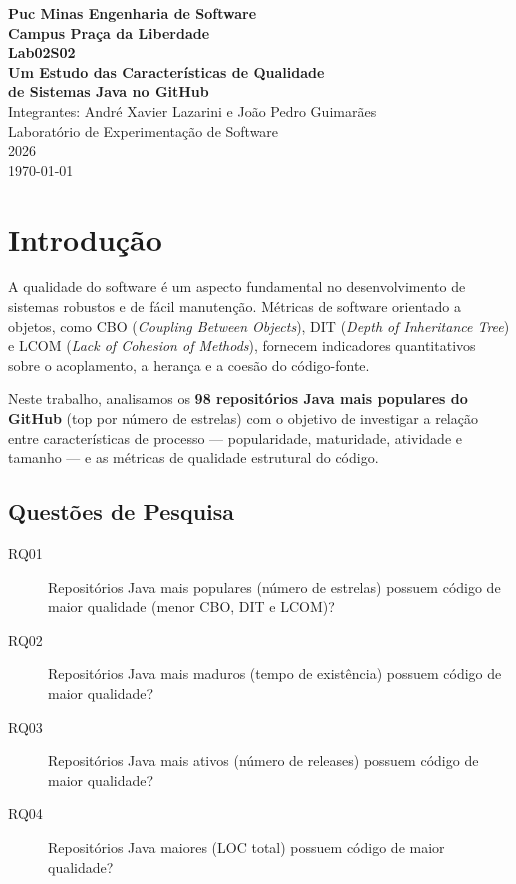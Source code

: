 \documentclass[12pt,a4paper]{article}
\begin{document}
\begin{titlepage}
    \centering
    \vspace*{2cm}
    {\Large\bfseries Puc Minas Engenharia de Software\\[0.5em]
    Campus Praça da Liberdade\\[3em]}
    {\large\bfseries Lab02S02\\[0.8em]}
    {\LARGE\bfseries Um Estudo das Características de Qualidade\\[0.3em]
    de Sistemas Java no GitHub\\[3em]}
    {\large Integrantes: André Xavier Lazarini e João Pedro Guimarães\\[2em]}
    \vfill
    {\large Laboratório de Experimentação de Software\\[1em]
    2026\\[2em]}
    \today
\end{titlepage}

\tableofcontents
\newpage

\section{Introdução}

A qualidade do software é um aspecto fundamental no desenvolvimento de sistemas
robustos e de fácil manutenção. Métricas de software orientado a objetos,
como CBO (\emph{Coupling Between Objects}), DIT (\emph{Depth of Inheritance Tree})
e LCOM (\emph{Lack of Cohesion of Methods}), fornecem indicadores quantitativos
sobre o acoplamento, a herança e a coesão do código-fonte.

Neste trabalho, analisamos os \textbf{98 repositórios Java mais populares do GitHub}
(top por número de estrelas) com o objetivo de investigar a relação entre
características de processo --- popularidade, maturidade, atividade e tamanho ---
e as métricas de qualidade estrutural do código.

\subsection{Questões de Pesquisa}

\begin{description}
    \item[RQ01] Repositórios Java mais populares (número de estrelas) possuem
    código de maior qualidade (menor CBO, DIT e LCOM)?
    \item[RQ02] Repositórios Java mais maduros (tempo de existência) possuem
    código de maior qualidade?
    \item[RQ03] Repositórios Java mais ativos (número de releases) possuem
    código de maior qualidade?
    \item[RQ04] Repositórios Java maiores (LOC total) possuem código de maior
    qualidade?
\end{description}
\end{document}
